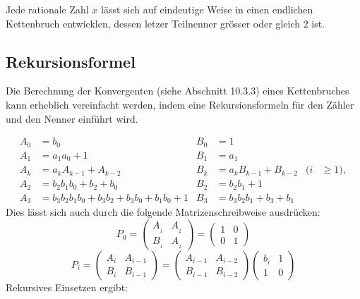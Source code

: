 Jede rationale Zahl $x$ lässt sich auf eindeutige Weise in einen
endlichen Kettenbruch entwicklen, dessen letzer Teilnenner grösser
oder gleich 2 ist.

\subsection{Rekursionsformel}
Die Berechnung der Konvergenten (siehe Abschnitt 10.3.3) eines Kettenbruches 
kann erheblich vereinfacht werden, indem eine Rekursionsformeln für den Zähler 
und den Nenner einführt wird.
\begin{beispiel}
\begin{align*}
A_0 &= b_0                     &   B_0 &= 1                                  \\
A_1 &= a_1a_0 + 1              &   B_1 &= a_1                                \\
A_k &= a_kA_{k-1} + A_{k-2}    &   B_k &= a_kB_{k-1} + B_{k-2} &(i &\ge 1),   \\
A_2 &= b_2b_1b_0 + b_2 + b_0   &   B_2 &= b_2b_1 + 1		             \\
A_3 &= b_3b_2b_1b_0 + b_3b_2 + b_3b_0 + b_1b_0 + 1 & B_3 &= b_3b_2b_1 + b_3 + b_1
\end{align*}
Dies lässt sich auch durch die folgende Matrizenschreibweise ausdrücken:
\begin{equation}
P_0 = 	\begin{pmatrix}
			A_{_1}&	A_{_2}\\
			B_{_1}&	A_{_2}
		\end{pmatrix}
		=\begin{pmatrix}
			1&	0\\
			0&	1
		\end{pmatrix}
\end{equation}
\begin{equation}
P_i = 	\begin{pmatrix}
			A_i&	A_{i-1}\\
			B_i&	B_{i-1}
		\end{pmatrix}
		=\begin{pmatrix}
			A_{i-1}&	A_{i-2}\\
			B_{i-1}&	B_{i-2}
		\end{pmatrix} 
		\begin{pmatrix}
			b_i	&	1\\
			1	&	0
		\end{pmatrix} 
\end{equation}
Rekursives Einsetzen ergibt:
\begin{equation}

\end{equation}
\end{beispiel}
